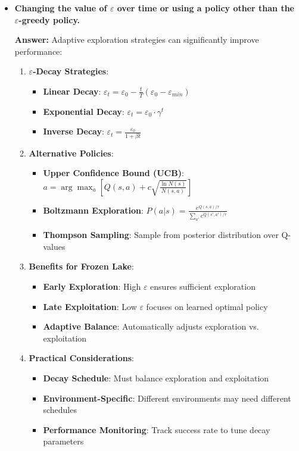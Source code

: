 \begin{itemize}
    \item \textbf{Changing the value of $\varepsilon$ over time or using a policy other than the $\varepsilon$-greedy policy.}
    
    \textbf{Answer:} Adaptive exploration strategies can significantly improve performance:
    
    \begin{enumerate}
        \item \textbf{$\varepsilon$-Decay Strategies}:
        \begin{itemize}
            \item \textbf{Linear Decay}: $\varepsilon_t = \varepsilon_0 - \frac{t}{T}(\varepsilon_0 - \varepsilon_{min})$
            \item \textbf{Exponential Decay}: $\varepsilon_t = \varepsilon_0 \cdot \gamma^t$
            \item \textbf{Inverse Decay}: $\varepsilon_t = \frac{\varepsilon_0}{1 + \beta t}$
        \end{itemize}
        
        \item \textbf{Alternative Policies}:
        \begin{itemize}
            \item \textbf{Upper Confidence Bound (UCB)}: $a = \arg\max_a [Q(s,a) + c\sqrt{\frac{\ln N(s)}{N(s,a)}}]$
            \item \textbf{Boltzmann Exploration}: $P(a|s) = \frac{e^{Q(s,a)/\tau}}{\sum_{a'} e^{Q(s',a')/\tau}}$
            \item \textbf{Thompson Sampling}: Sample from posterior distribution over Q-values
        \end{itemize}
        
        \item \textbf{Benefits for Frozen Lake}:
        \begin{itemize}
            \item \textbf{Early Exploration}: High $\varepsilon$ ensures sufficient exploration
            \item \textbf{Late Exploitation}: Low $\varepsilon$ focuses on learned optimal policy
            \item \textbf{Adaptive Balance}: Automatically adjusts exploration vs. exploitation
        \end{itemize}
        
        \item \textbf{Practical Considerations}:
        \begin{itemize}
            \item \textbf{Decay Schedule}: Must balance exploration and exploitation
            \item \textbf{Environment-Specific}: Different environments may need different schedules
            \item \textbf{Performance Monitoring}: Track success rate to tune decay parameters
        \end{itemize}
    \end{enumerate}
    

\end{itemize}
